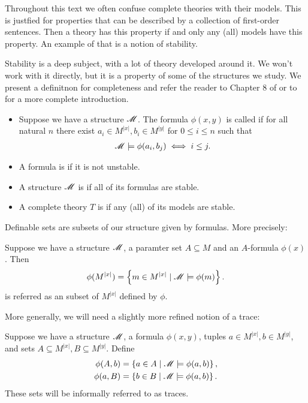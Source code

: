 Throughout this text we often confuse complete theories with their models.
This is justfied for properties that can be described by a collection of first-order sentences.
Then a theory has this property if and only any (all) models have this property.
An example of that is a notion of stability.

Stability is a deep subject, with a lot of theory developed around it.
We won't work with it directly, but it is a property of some of the structures we study.
We present a definitnon for completeness and refer the reader to Chapter 8 of \cite{tent} or to \cite{pillay} for a more complete introduction.

\begin{Definition}
  \begin{itemize}
  \item Suppose we have a structure $\mathscr M$.
    The formula $\phi(x,y)$ is called  if for all natural $n$
    there exist $a_i \in M^{|x|}, b_i \in M^{|y|}$ for $0 \leq i \leq n$ such that
    \begin{align*}
      \mathscr M \models \phi(a_i, b_j) \iff i \leq j.
    \end{align*}
  \item A formula is  if it is not unstable.
  \item A structure $\mathscr M$ is  if all of its formulas are stable.
  \item A complete theory $T$ is  if any (all) of its models are stable.
  \end{itemize}
\end{Definition}

Definable sets are subsets of our structure given by formulas.
More precisely:
\begin{Definition}
  Suppose we have a structure $\mathscr M$, a paramter set $A \subseteq M$ and an $A$-formula $\phi(x)$.
  Then
  \begin{align*}
    \phi(M^{|x|}) = \left\{m \in M^{|x|} \mid \mathscr M \models \phi(m)\right\}.
  \end{align*}
  is referred as an  subset of $M^{|x|}$ defined by $\phi$.
\end{Definition}

More generally, we will need a slightly more refined notion of a trace:
\begin{Definition}
  Suppose we have a structure $\mathscr M$, a formula $\phi(x, y)$, tuples $a \in M^{|x|}, b \in M^{|y|}$, and
  sets $A \subseteq M^{|x|}, B \subseteq M^{|y|}$. 
  Define
  \begin{align*}
    \phi(A, b) &= \left\{a \in A \mid \mathscr M \models \phi(a,b)\right\}, \\
    \phi(a, B) &= \left\{b \in B \mid \mathscr M \models \phi(a,b)\right\}.
  \end{align*}
  These sets will be informally referred to as traces.
\end{Definition}

